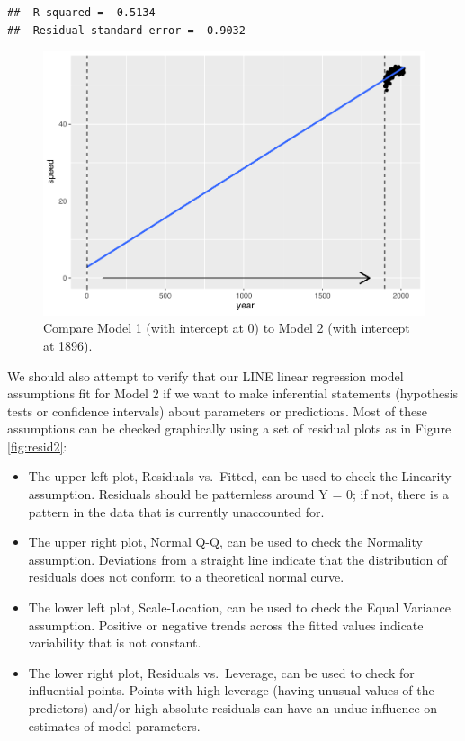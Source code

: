 \documentclass[
]{krantz}
\providecommand{\tightlist}{%
  \setlength{\itemsep}{0pt}\setlength{\parskip}{0pt}}
\begin{document}
\begin{verbatim}
##  R squared =  0.5134 
##  Residual standard error =  0.9032
\end{verbatim}

\begin{figure}

{\centering \includegraphics[width=0.9\linewidth]{bookdown-BeyondMLR_files/figure-latex/center-1} 

}

\caption{Compare Model 1 (with intercept at 0) to Model 2 (with intercept at 1896).}\label{fig:center}
\end{figure}

We should also attempt to verify that our LINE linear regression model assumptions fit for Model 2 if we want to make inferential statements (hypothesis tests or confidence intervals) about parameters or predictions. Most of these assumptions can be checked graphically using a set of residual plots as in Figure \ref{fig:resid2}:

\begin{itemize}
\tightlist
\item
  The upper left plot, Residuals vs.~Fitted, can be used to check the Linearity assumption. Residuals should be patternless around Y = 0; if not, there is a pattern in the data that is currently unaccounted for.
\item
  The upper right plot, Normal Q-Q, can be used to check the Normality assumption. Deviations from a straight line indicate that the distribution of residuals does not conform to a theoretical normal curve.
\item
  The lower left plot, Scale-Location, can be used to check the Equal Variance assumption. Positive or negative trends across the fitted values indicate variability that is not constant.
\item
  The lower right plot, Residuals vs.~Leverage, can be used to check for influential points. Points with high leverage (having unusual values of the predictors) and/or high absolute residuals can have an undue influence on estimates of model parameters.
\end{itemize}
\end{document}
